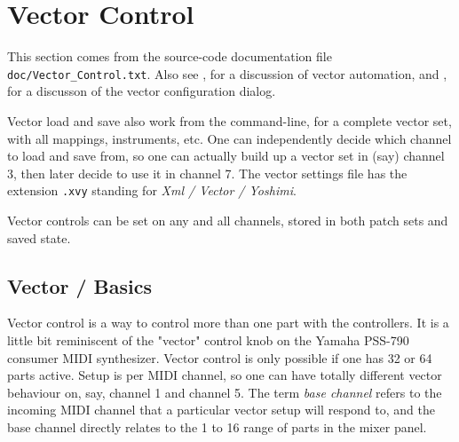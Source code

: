 %
%
%

\section{Vector Control}
\label{sec:vector}

   This section comes from the source-code documentation file
   \texttt{doc/Vector\_Control.txt}.
   Also see
   , for a discussion
   of vector automation, and
   , for a discusson of the vector
   configuration dialog.

   Vector load and save also work from the command-line, for a complete vector
   set, with all mappings, instruments, etc.
   One can independently decide which
   channel to load and save from, so one can actually build up a vector set in
   (say) channel 3, then later decide to use it in channel 7.
   The vector settings file
   has the extension \texttt{.xvy} standing for
   \textsl{Xml / Vector / Yoshimi}.

   Vector controls can be set on any and all channels,
   stored in both patch sets and saved state.

\subsection{Vector / Basics}
\label{subsection:vector_basics}

   Vector control is a way to control more than one part with the controllers.
   It is a little bit reminiscent of the "vector" control knob on the Yamaha
   PSS-790 consumer MIDI synthesizer.  Vector control is only possible if one
   has 32 or 64 parts active.  Setup is per MIDI channel, so one can have
   totally different vector behaviour on, say, channel 1 and channel 5.
    The term \textsl{base channel} refers to the
   incoming MIDI channel that a particular vector setup will respond to, and
   the base channel directly relates to the 1 to 16 range of parts in the mixer
   panel.

